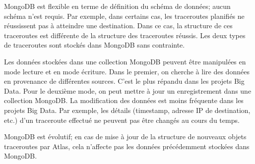 MongoDB est flexible en terme de définition du schéma de données; aucun schéma n'est requis.   Par exemple, dans certains cas, les traceroutes planifiés ne réussissent pas à atteindre une destination. Dans ce cas, la structure de ces  traceroutes est différente  de la structure des traceroutes réussis. Les deux types de traceroutes sont stockés dans MongoDB sans contrainte.

Les données stockées dans une collection MongoDB peuvent être manipulées en mode lecture et en mode écriture. Dans le premier, on cherche à lire des données en provenance de différentes sources. C'est le plus répandu dans les projets Big Data. Pour le deuxième mode, on peut mettre à jour un enregistrement dans une collection MongoDB. La modification des données  est moins fréquente dans les projets Big Data. Par exemple, les détails (timestamp, adresse IP de destination, etc.) d'un traceroute effectué ne peuvent pas être changés au cours du temps.

 
 MongoDB est évolutif; en cas de   mise à jour de la structure de nouveaux  objets traceroutes par Atlas,  cela n'affecte pas les données précédemment  stockées  dans MongoDB.
 




